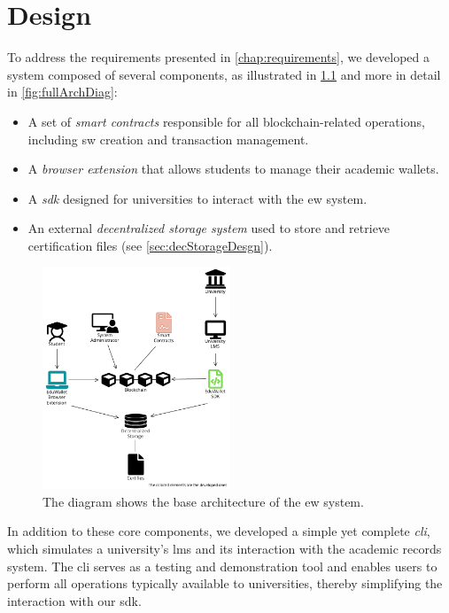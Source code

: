\chapter{Design}
To address the requirements presented in \cref{chap:requirements}, we developed a system composed of several components, as illustrated in \cref{fig:baseArchDiag}
and more in detail in \cref{fig:fullArchDiag}:
\begin{itemize}
    \item A set of \textit{smart contracts} responsible for all blockchain-related operations, including \acrshort{sw} creation and transaction management.
    \item A \textit{browser extension} that allows students to manage their academic wallets.
    \item A \textit{\acrfull{sdk}} designed for universities to interact with the \acrshort{ew} system.
    \item An external \textit{decentralized storage system} used to store and retrieve certification files (see \cref{sec:decStorageDesgn}).
\end{itemize}
\begin{figure}[htpb]
  \centering
  \includegraphics[width=0.5\textwidth]{figures/Architecture diagram basic.pdf}
  \caption[System basic architecture diagram]{The diagram shows the base architecture of the \acrlong{ew} system.}
  \label{fig:baseArchDiag}
\end{figure}

In addition to these core components, we developed a simple yet complete \textit{\acrfull{cli}}, which simulates a university's \acrshort{lms} and its interaction with the academic records system. The \acrshort{cli} serves as a testing and demonstration tool and enables users to perform all operations typically available to universities, thereby simplifying the interaction with our \acrshort{sdk}.

